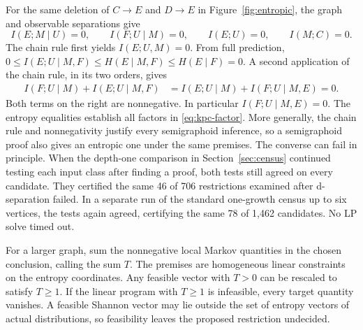 For the same deletion of \(C\to E\) and \(D\to E\) in
Figure~\ref{fig:entropic}, the graph and observable separations give
\[
 I(E;M\mid U)=0,\qquad I(F;U\mid M)=0,\qquad I(E;U)=0,\qquad I(M;C)=0.
\]
The chain rule first yields \(I(E;U,M)=0\). From full prediction,
\(0\le I(E;U\mid M,F)\le H(E\mid M,F)\le H(E\mid F)=0\).
A second application of the chain rule, in its two orders, gives
\begin{align}
 I(F;U\mid M)+I(E;U\mid M,F)
 &= I(E;U\mid M)+I(F;U\mid M,E)=0 . \label{eq:kpc-entropy}
\end{align}
Both terms on the right are nonnegative. In particular \(I(F;U\mid M,E)=0\).
The entropy equalities establish all factors in \eqref{eq:kpc-factor}.
More generally, the chain rule and nonnegativity justify every
semigraphoid inference, so a semigraphoid proof also gives an entropic
one under the same premises. The converse can fail in principle.
When the depth-one comparison in Section~\ref{sec:census} continued
testing each input class after finding a proof, both tests still
agreed on every candidate. They certified the same 46 of 706
restrictions examined after d-separation failed. In a separate run of
the standard one-growth census up to six vertices, the tests again agreed,
certifying the same 78 of 1,462 candidates. No LP solve timed out.

For a larger graph, sum the nonnegative local Markov quantities in the chosen
conclusion, calling the sum \(T\). The premises are homogeneous linear
constraints on the entropy coordinates. Any feasible vector with \(T>0\)
can be rescaled to satisfy \(T\geq1\). If the linear program with
\(T\geq1\) is infeasible, every target quantity vanishes. A feasible
Shannon vector may lie outside the set of entropy vectors of actual
distributions, so feasibility leaves the proposed restriction undecided.

